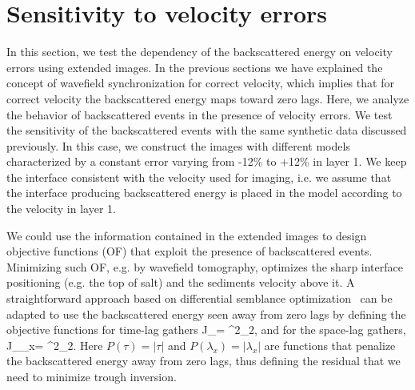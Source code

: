 


\section{Sensitivity to velocity errors}


In this section, we test the dependency of the backscattered energy on velocity errors using extended images. In the previous sections 
we have explained the concept of wavefield synchronization for correct velocity, which implies that for correct velocity the backscattered energy maps 
toward zero lags. Here, we analyze the behavior of backscattered events in the presence of velocity errors.
We test the sensitivity of the backscattered events with the same synthetic data discussed previously. In this case, we construct the images
with different models characterized by a constant error varying from -12\% to +12\% in layer 1. We keep the interface 
consistent with the velocity used for imaging, i.e. we assume that the interface producing backscattered energy is placed in the model
according to the velocity in layer 1.

We could use the information contained in the extended images to design objective functions (OF) that exploit the presence of backscattered events. 
Minimizing such OF, e.g. by wavefield tomography, optimizes the sharp interface positioning (e.g. the top of salt) and the sediments velocity above it.
A straightforward approach based on differential semblance optimization~\citep{shen:2132} can be adapted to use
 the backscattered energy seen away from zero lags by defining the objective functions for time-lag gathers
\beq
 J_{\tau}=  ^2_2,
\label{eq:of1}
\eeq 
and for the space-lag gathers,
\beq
 J_{\lambda_x}=  ^2_2.
\label{eq:of2}
\eeq 
%
Here $P(\tau)=|\tau|$ and $P(\lambda_x)=|\lambda_x|$ are functions that penalize the backscattered energy away 
from zero lags, thus defining the residual that we need to minimize trough inversion.

